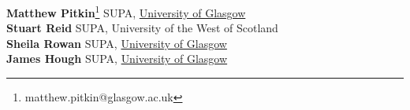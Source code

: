 \textbf{Matthew Pitkin}\footnote{matthew.pitkin@glasgow.ac.uk} SUPA, \href{https://www.authorea.com/inst/2231}{University of Glasgow} \\
\textbf{Stuart Reid} SUPA, University of the West of Scotland \\
\textbf{Sheila Rowan} SUPA, \href{https://www.authorea.com/inst/2231}{University of Glasgow} \\
\textbf{James Hough} SUPA, \href{https://www.authorea.com/inst/2231}{University of Glasgow} \\

  
  
  
  
